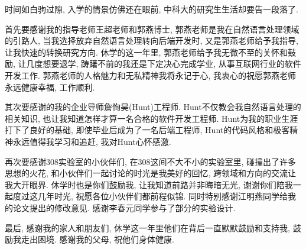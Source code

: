 
\begin{acknowledgements}

时间如白驹过隙, 入学的情景仿佛还在眼前, 中科大的研究生生活却要告一段落了.

首先要感谢我的指导老师王超老师和郭燕博士, 郭燕老师是我在自然语言处理领域的引路人, 当我选择放弃自然语言处理转向后端开发时,
又是郭燕老师给予我指导, 让我快速的转换研究方向. 休学的这一年里, 郭燕老师给予我无微不至的关怀和鼓励, 让几度想要退学, 踌躇不前的我还是下定决心完成学业, 从事互联网行业的软件开发工作.
郭燕老师的人格魅力和无私精神我将永记于心, 我衷心的祝愿郭燕老师永远健康幸福, 工作顺利.

其次要感谢的我的企业导师詹恂昊(Hunt)工程师. Hunt不仅教会我自然语言处理的相关知识, 也让我知道怎样才算一名合格的软件开发工程师.
Hunt为我的职业生涯打下了良好的基础, 即使毕业后成为了一名后端工程师, Hunt的代码风格和极客精神永远值得我学习和追赶, 我对Hunt心怀感激.

再次要感谢308实验室的小伙伴们, 在308这间不大不小的实验室里, 碰撞出了许多思想的火花, 和小伙伴们一起讨论的时光是我美好的回忆, 跨领域和方向的交流让我大开眼界.
休学时也是你们鼓励我, 让我知道前路并非晦暗无光, 谢谢你们陪我一起度过这几年时光, 祝愿各位小伙伴们都前程似锦. 同时特别感谢江明燕同学给我的论文提出的修改意见.
感谢李春元同学参与了部分的实验设计.

最后, 感谢我的家人和朋友们, 休学这一年里他们在背后一直默默鼓励和支持我, 鼓励我走出困境. 感谢我的父母, 祝他们身体健康.

\end{acknowledgements}
